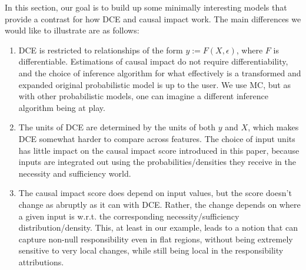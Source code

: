 \documentclass[anon,12pt]{clear2026} %
\begin{document}
In this section, our goal is to build up some minimally interesting models that provide a contrast for how DCE and causal impact work. The main differences we would like to illustrate are as follows:

\begin{enumerate}
\item DCE is restricted to relationships of the form $y := F(X, \epsilon)$, where $F$ is differentiable. Estimations of causal impact do not require differentiability, and the choice of inference algorithm for what effectively is a transformed and expanded original probabilistic model is up to the user. We use MC, but as with other probabilistic models, one can imagine a different inference algorithm being at play.

\item The units of DCE are determined by the units of both $y$ and $X$, which makes DCE somewhat harder to compare across features. The choice of input units has little impact on the causal impact score introduced in this paper, because inputs are integrated out using the probabilities/densities they receive in the necessity and sufficiency world.

\item  The causal impact score does depend on input values, but the score doesn't change as abruptly as it can with DCE. Rather, the change depends on where a given input is w.r.t. the corresponding necessity/sufficiency distribution/density. This, at least in our example, leads to a notion that can capture non-null responsibility even in flat regions, without being extremely sensitive to very local changes, while still being local in the responsibility attributions.

\end{enumerate}
\end{document}
